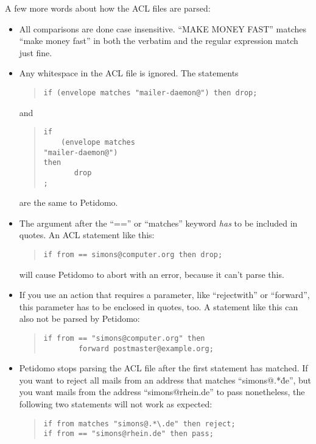 \documentclass[a4paper,10pt]{scrreprt}
\begin{document}
A few more words about how the ACL files are parsed:
\begin{itemize}

\item All comparisons are done case insensitive. ``MAKE MONEY FAST''
matches ``make money fast'' in both the verbatim and the regular
expression match just fine.

\item Any whitespace in the ACL file is ignored. The statements
\begin{quote}
\begin{verbatim}
if (envelope matches "mailer-daemon@") then drop;
\end{verbatim}
\end{quote}
and
\begin{quote}
\begin{verbatim}
if
    (envelope matches
"mailer-daemon@")
then
       drop
;
\end{verbatim}
\end{quote}
are the same to Petidomo.

\item The argument after the ``=='' or ``matches'' keyword \emph{has}
to be included in quotes. An ACL statement like this:
\begin{quote}
\begin{verbatim}
if from == simons@computer.org then drop;
\end{verbatim}
\end{quote}
will cause Petidomo to abort with an error, because it can't parse
this.

\item If you use an action that requires a parameter, like
``rejectwith'' or ``forward'', this parameter has to be enclosed in
quotes, too. A statement like this can also not be parsed by
Petidomo:
\begin{quote}
\begin{verbatim}
if from == "simons@computer.org" then
        forward postmaster@example.org;
\end{verbatim}
\end{quote}

\item Petidomo stops parsing the ACL file after the first statement
has matched. If you want to reject all mails from an address that
matches ``simons@.*\.de'', but you want mails from the address
``simons@rhein.de'' to pass nonetheless, the following two statements
will not work as expected:
\begin{quote}
\begin{verbatim}
if from matches "simons@.*\.de" then reject;
if from == "simons@rhein.de" then pass;
\end{verbatim}
\end{quote}


\end{itemize}
\end{document}
